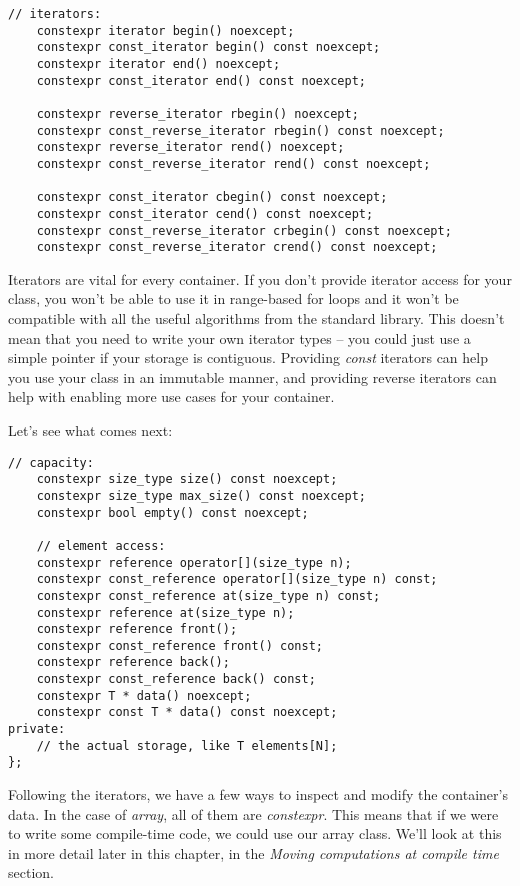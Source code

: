 \begin{lstlisting}[style=styleCXX]
	 // iterators:
	constexpr iterator begin() noexcept;
	constexpr const_iterator begin() const noexcept;
	constexpr iterator end() noexcept;
	constexpr const_iterator end() const noexcept;
	
	constexpr reverse_iterator rbegin() noexcept;
	constexpr const_reverse_iterator rbegin() const noexcept;
	constexpr reverse_iterator rend() noexcept;
	constexpr const_reverse_iterator rend() const noexcept;
	
	constexpr const_iterator cbegin() const noexcept;
	constexpr const_iterator cend() const noexcept;
	constexpr const_reverse_iterator crbegin() const noexcept;
	constexpr const_reverse_iterator crend() const noexcept;

\end{lstlisting}

Iterators are vital for every container. If you don't provide iterator access for your class, you won't be able to use it in range-based for loops and it won't be compatible with all the useful algorithms from the standard library. This doesn't mean that you need to write your own iterator types – you could just use a simple pointer if your storage is contiguous. Providing \textit{const} iterators can help you use your class in an immutable manner, and providing reverse iterators can help with enabling more use cases for your container.

Let's see what comes next:

\begin{lstlisting}[style=styleCXX]
	// capacity:
	constexpr size_type size() const noexcept;
	constexpr size_type max_size() const noexcept;
	constexpr bool empty() const noexcept;
	
	// element access:
	constexpr reference operator[](size_type n);
	constexpr const_reference operator[](size_type n) const;
	constexpr const_reference at(size_type n) const;
	constexpr reference at(size_type n);
	constexpr reference front();
	constexpr const_reference front() const;
	constexpr reference back();
	constexpr const_reference back() const;
	constexpr T * data() noexcept;
	constexpr const T * data() const noexcept;
private:
	// the actual storage, like T elements[N];
};

\end{lstlisting}

Following the iterators, we have a few ways to inspect and modify the container's data. In the case of \textit{array}, all of them are \textit{constexpr}. This means that if we were to write some compile-time code, we could use our array class. We'll look at this in more detail later in this chapter, in the \textit{Moving computations at compile time} section.

